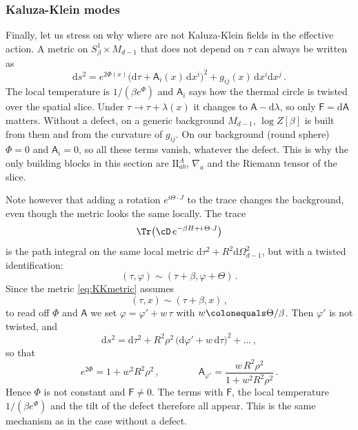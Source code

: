 \documentclass[a4paper,11pt]{article}
\newcommand{\II}{\mathrm{I\!I}}
\newcommand{\dd}{\mathrm{d}}
\begin{document}
\subsubsection{Kaluza-Klein modes}
Finally, let us stress on why where are not Kaluza-Klein fields in the effective action. A metric on $S^1_\beta\times M_{d-1}$ that does not depend on $\tau$ can always be written as
\begin{equation}\label{eq:KKmetric}
	\dd s^2=e^{2\Phi(x)}\bigl(\dd\tau+\mathsf{A}_i(x)\,\dd x^i\bigr)^2+g_{ij}(x)\,\dd x^i\dd x^j\, .
\end{equation}
The local temperature is $1/(\beta e^{\Phi})$ and $\mathsf{A}_i$ says how the thermal circle is twisted over the spatial slice. Under $\tau\to\tau+\lambda(x)$ it changes to $\mathsf{A}-\dd\lambda$, so only $\mathsf{F}=\dd\mathsf{A}$ matters. Without a defect, on a generic background $M_{d-1}$, $\log Z[\beta]$ is built from them and from the curvature of $g_{ij}$. On our background (round sphere) $\Phi=0$ and $\mathsf{A}_i=0$, so all these terms vanish, whatever the defect. This is why the only building blocks in this section are $\II^A_{ab}$, $\nabla_a$ and the Riemann tensor of the slice.

Note however that adding a rotation $e^{i\Theta\cdot J}$ to the trace changes the background, even though the metric looks the same locally. The trace
\begin{equation}
	\Tr\bigl(\cD\,e^{-\beta H+i\,\Theta\cdot J}\bigr)
\end{equation}
is the path integral on the same local metric $\dd\tau^2+R^2\dd\Omega_{d-1}^2$, but with a twisted identification: 
\begin{equation}
	(\tau,\varphi)\sim(\tau+\beta,\varphi+\Theta)\, .
\end{equation}
Since the metric \eqref{eq:KKmetric} assumes
\begin{equation}
	(\tau,x)\sim(\tau+\beta,x)\, ,
\end{equation}
to read off $\Phi$ and $\mathsf{A}$ we set $\varphi=\varphi'+w\,\tau$ with $w\colonequals\Theta/\beta$. Then $\varphi'$ is not twisted, and
\begin{equation}
	\dd s^2=\dd\tau^2+R^2\rho^2\,\bigl(\dd\varphi'+w\,\dd\tau\bigr)^2+\dots\, ,
\end{equation}
so that
\begin{equation}
	e^{2\Phi}=1+w^2R^2\rho^2\, ,\qquad\qquad
	\mathsf{A}_{\varphi'}=\frac{w\,R^2\rho^2}{1+w^2R^2\rho^2}\, .
\end{equation}
Hence $\Phi$ is not constant and $\mathsf{F}\neq0$. The terms with $\mathsf{F}$, the local temperature $1/(\beta e^{\Phi})$ and the tilt of the defect therefore all appear. This is the same mechanism as in the case without a defect.
\end{document}
